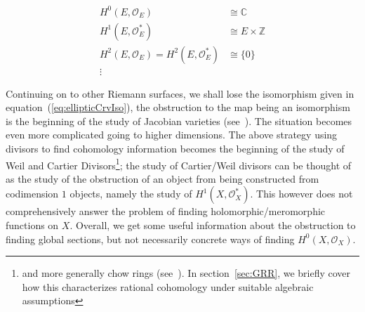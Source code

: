 \documentclass{book}
\newcommand{\Z}{{\mathbb{Z}}}
\newcommand{\C}{{\mathbb{C}}}
\newcommand{\CO}{{\mathcal{O}}}
\begin{document}
\begin{align*}
  H^0(E, \CO_{E}) &\cong \C\\
  H^1(E, \CO_{E}^*) &\cong E\times \Z\\
  H^2(E, \CO_{E}) = H^2(E, \CO_{E}^*)&\cong \{0\}\\
  \vdots
\end{align*}

Continuing on to other Riemann surfaces, we shall lose the isomorphism given in
equation~(\ref{eq:ellipticCrvIso}), the obstruction to the map being an isomorphism is the beginning of the
study of Jacobian varieties (see~\cite[section~6.4]{NateComplexAnalysis}). The situation becomes even more
complicated going to higher dimensions. The above strategy using divisors to find cohomology information
becomes the beginning of the study of Weil and Cartier Divisors\footnote{and more generally chow rings
(see~\cite{NateAlgGeo}). In section~\ref{sec:GRR}, we briefly cover how this characterizes rational cohomology under
suitable algebraic assumptions}; the study of Cartier/Weil divisors can be thought of as the study of the
obstruction of an object from being constructed from codimension $1$ objects, namely the study of $H^1(X,
\CO_X^*)$. This however does not comprehensively answer the problem of finding holomorphic/meromorphic
functions on $X$. Overall, we get some useful information about the obstruction to finding global sections,
but not necessarily concrete ways of finding $H^0(X, \CO_X)$.
\end{document}
